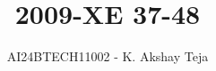 \documentclass[journal,9pt,onecolumn]{IEEEtran}
\begin{document}

\vspace{3cm}
\title{2009-XE 37-48}
\author{AI24BTECH11002 - K. Akshay Teja}
\maketitle
 \bigskip
{\let\newpage\relax\maketitle}

\renewcommand{\thefigure}{\theenumi}
\renewcommand{\thetable}{\theenumi}
\setlength{\intextsep}{10pt} %

\renewcommand{\thetable}{\theenumi}
\end{document}
